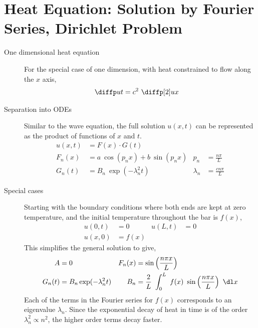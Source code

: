 \section{Heat Equation: Solution by Fourier Series, Dirichlet Problem}

\begin{description}
    \item[One dimensional heat equation] For the special case of one dimension, with
        heat constrained to flow along the $ x $ axis,
        \begin{align}
            \diffp ut & = c^2\ \diffp[2] ux
        \end{align}

    \item[Separation into ODEs] Similar to the wave equation, the full solution
        $ u(x, t) $ can be represented as the product of functions of $ x $ and $ t $.
        \begin{align}
            u(x, t)   & = F(x) \cdot G(t)                   \\
            F_n(x)    & = a\ \cos(p_n x) + b\ \sin(p_n x) &
            p_n       & = \frac{n\pi}{L}                    \\
            G_n(t)    & = B_n\ \exp(-\lambda_n^2 t)       &
            \lambda_n & = \frac{cn \pi}{L}
        \end{align}

    \item[Special cases] Starting with the boundary conditions where both ends are kept
        at zero temperature, and the initial temperature throughout the bar is $ f(x) $,
        \begin{align}
            u(0, t) & = 0    & u(L, t) & = 0 \\
            u(x, 0) & = f(x)
        \end{align}
        This simplifies the general solution to give,
        \begin{align}
            A      & = 0                                                            &
            F_n(x) & = \sin\left( \frac{n\pi x}{L} \right)                            \\
            G_n(t) & = B_n \exp(-\lambda_n^2 t)                                     &
            B_n    & = \frac{2}{L}\ \int_{0}^{L}\ f(x)\ \sin\left( \frac{n\pi x}{L}
            \right)\ \dl x
        \end{align}
        Each of the terms in the Fourier series for $ f(x) $ corresponds to an eigenvalue
        $ \lambda_n $. Since the exponential decay of heat in time is of the order
        $ \lambda_n^2 \propto n^2 $, the higher order terms decay faster.


\end{description}
